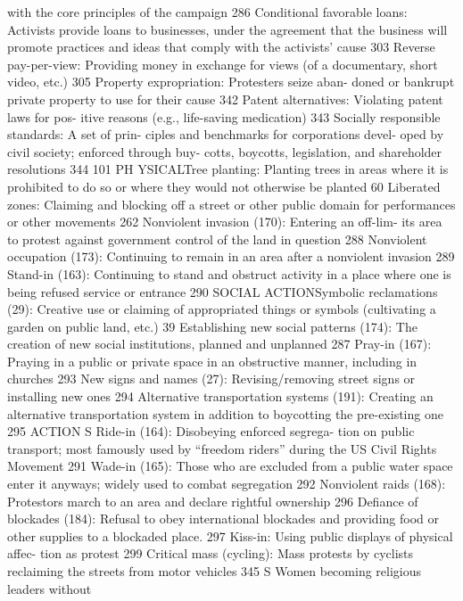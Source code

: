\documentclass[twoside,a4paper,12pt,fleqn,openany]{extbook}
\begin{document}
with the core principles of the campaign 286
Conditional favorable loans: Activists provide
loans to businesses, under the agreement that
the business will promote practices and ideas
that comply with the activists’ cause
 303
Reverse pay-per-view: Providing money in
exchange for views (of a documentary, short
video, etc.)
 305
Property expropriation: Protesters seize aban-
doned or bankrupt private property to use for
their cause
 342
Patent alternatives: Violating patent laws for pos-
itive reasons (e.g., life-saving medication) 343
Socially responsible standards: A set of prin-
ciples and benchmarks for corporations devel-
oped by civil society; enforced through buy-
cotts, boycotts, legislation, and shareholder
resolutions
 344
101
PH YSICALTree planting: Planting trees in areas where it
is prohibited to do so or where they would not
otherwise be planted
 60
Liberated zones: Claiming and blocking off a
street or other public domain for performances
or other movements
 262
Nonviolent invasion (170): Entering an off-lim-
its area to protest against government control
of the land in question
 288
Nonviolent occupation (173): Continuing to
remain in an area after a nonviolent invasion		
289
Stand-in (163): Continuing to stand and obstruct
activity in a place where one is being refused
service or entrance
 290
SOCIAL ACTIONSymbolic reclamations (29): Creative use or
claiming of appropriated things or symbols
(cultivating a garden on public land, etc.) 39
Establishing new social patterns (174): The
creation of new social institutions, planned and
unplanned
 287
Pray-in (167): Praying in a public or private
space in an obstructive manner, including in
churches
 293
New signs and names (27): Revising/removing
street signs or installing new ones
 294
Alternative transportation systems (191):
Creating an alternative transportation system
in addition to boycotting the pre-existing
one
 295
ACTION S
Ride-in (164): Disobeying enforced segrega-
tion on public transport; most famously used
by “freedom riders” during the US Civil Rights
Movement
 291
Wade-in (165): Those who are excluded from
a public water space enter it anyways; widely
used to combat segregation
 292
Nonviolent raids (168): Protestors march to an
area and declare rightful ownership
 296
Defiance of blockades (184): Refusal to obey
international blockades and providing food or
other supplies to a blockaded place.
 297
Kiss-in: Using public displays of physical affec-
tion as protest
 299
Critical mass (cycling): Mass protests by cyclists
reclaiming the streets from motor vehicles 345
S
Women becoming religious leaders without
\end{document}
